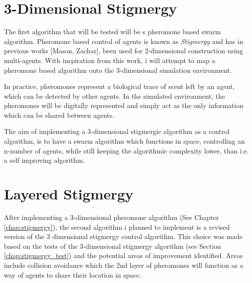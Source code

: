 \section{3-Dimensional Stigmergy}
\label{sec:3dimstig}
The first algorithm that will be tested will be s pheromone based swarm algorithm. Pheromone based control of agents is known as \textit{Stigmergy} \cite{mason_programming_2003} and has in previous works [Mason, Zachar], been used for 2-dimensional construction using multi-agents. With inspiration from this work, i will attempt to map a pheromone based algorithm onto the 3-dimensional simulation environment. 

In practice, pheromones represent a biological trace of scent left by an agent, which can be detected by other agents. In the simulated environment, the pheromones will be digitally represented and simply act as the only information which can be shared between agents. 

The aim of implementing a 3-dimensional stigmergic algorithm as a control algorithm, is to have a swarm algorithm which functions in space, controlling an n-number of agents, while still keeping the algorithmic complexity lower, than i.e. a self improving algorithm. 
 
\section{Layered Stigmergy}
After implementing a 3-dimensional pheromone algorithm (See Chapter \ref{chap:stigmergy}), the second algorithm i planned to implement is a revised version of the 3 dimensional stigmergy control algorithm. This choice was made based on the tests of the 3-dimensional stigmergy algorithm (see Section \ref{chap:stigmergy_test}) and the potential areas of improvement identified. Areas include collision avoidance which the 2nd layer of pheromones will function as a way of agents to share their location in space.



